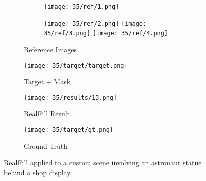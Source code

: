 \documentclass{article}
\begin{document}
\begin{figure}[H]
    \centering
    \begin{subfigure}[b]{0.24\linewidth}
        \begin{subfigure}[b]{0.65\linewidth}
            \texttt{[image: 35/ref/1.png]}
        \end{subfigure}
        \begin{subfigure}[b]{0.32\linewidth}
            \texttt{[image: 35/ref/2.png]}
            \texttt{[image: 35/ref/3.png]}
            \texttt{[image: 35/ref/4.png]}
        \end{subfigure}
        \caption{Reference Images}
    \end{subfigure}
    \hfill
    \begin{subfigure}[b]{0.24\linewidth}
        \centering
        \texttt{[image: 35/target/target.png]}
        \caption{Target + Mask}
    \end{subfigure}
    \hfill
    \begin{subfigure}[b]{0.24\linewidth}
        \centering
        \texttt{[image: 35/results/13.png]}
        \caption{RealFill Result}
    \end{subfigure}
    \hfill
    \begin{subfigure}[b]{0.24\linewidth}
        \centering
        \texttt{[image: 35/target/gt.png]}
        \caption{Ground Truth}
    \end{subfigure}
    \caption{RealFill applied to a custom scene involving an astronaut statue behind a shop display.}
    \label{fig:custom_data_example}
\end{figure}
\end{document}
